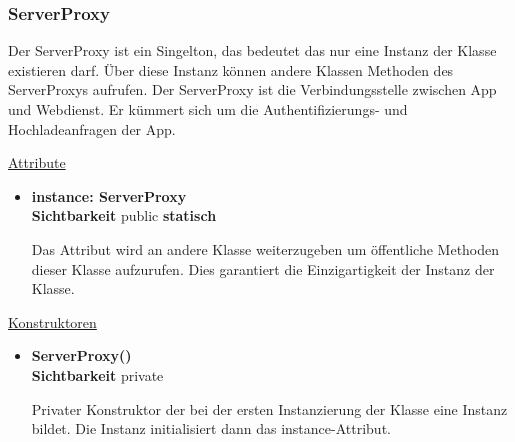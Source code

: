 \subsubsection{ServerProxy} \label{app:klasse:ServerProxy}
Der ServerProxy ist ein Singelton, das bedeutet das nur eine Instanz der  Klasse existieren darf. Über diese Instanz können andere Klassen Methoden des ServerProxys aufrufen. Der ServerProxy ist die Verbindungsstelle zwischen App und Webdienst. Er kümmert sich um die Authentifizierungs- und Hochladeanfragen der App.\newline

\underline{Attribute}
\begin{itemize}
\itemsep0pt
\item \textbf{instance: ServerProxy} \hfill\\ 
\textbf{Sichtbarkeit} public \newline
\textbf{statisch} 

Das Attribut wird an andere Klasse weiterzugeben um öffentliche Methoden dieser Klasse aufzurufen. Dies garantiert die Einzigartigkeit der Instanz der Klasse. 

\end{itemize}

\underline{Konstruktoren}
\begin{itemize}
\itemsep0pt
\item \textbf{ServerProxy()} \hfill\\
\textbf{Sichtbarkeit} private

Privater Konstruktor der bei der ersten Instanzierung der Klasse eine Instanz bildet. Die Instanz initialisiert dann das instance-Attribut. 
\end{itemize}

